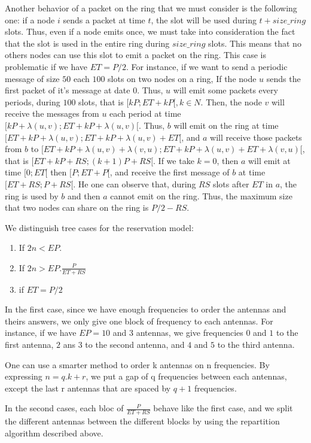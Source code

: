 \documentclass[a4paper,10pt]{article}
\begin{document}
Another behavior of a packet on the ring that we must consider is the following one:
 if a node $i$ sends a packet at time $t$, the slot will be used during $t+ size\_ring$ slots. Thus, even if a node emits once, we must take into consideration the fact that the slot is used in the entire ring during $size\_ring$ slots. This means that no others nodes can use this slot to emit a packet on the ring.
This case is problematic if we have $ET =P/2$. For instance, if we want to send a periodic message of size $50$ each $100$ slots on two nodes on a ring, If the node $u$ sends the first packet of it's message at date $0$. Thus, $u$ will emit some packets every periods, during $100$ slots, that is $[kP;ET+kP[, k \in N$. Then, the node $v$ will receive the messages from $u$ each period at time $[kP + \lambda(u,v);ET+kP+\lambda(u,v)[$. Thus, $b$ will emit on the ring at time $[ET + kP + \lambda(u,v);ET+kP+\lambda(u,v) + ET[$, and $a$ will receive those packets from $b$ to $[ET + kP + \lambda(u,v) + \lambda(v,u);ET+kP+\lambda(u,v) + ET + \lambda(v,u)[$, that is $[ET + kP + RS; (k+1)P+RS[$. If we take $k=0$, then $a$ will emit at time $[0;ET[$ then $[P;ET+P[$, and receive the first message of $b$ at time $[ET + RS;  P+RS[$. He one can observe that, during $RS$ slots after $ET$ in $a$, the ring is used by $b$ and then $a$ cannot emit on the ring. Thus, the maximum size that two nodes can share on the ring is $P/2 -RS$.

We distinguish tree cases for the reservation model:
\begin{enumerate}
\item If $2n < EP $.
\item If $2n >EP . \frac{P}{ET+RS}$
\item if $ET = P/2$
\end{enumerate}
	
In the first case, since we have enough frequencies to order the antennas and theirs answers, we only give one block of frequency to each antennas. For instance, if we have $EP = 10$ and $3$ antennas, we give frequencies $0$ and $1$ to the first antenna, $2$ ans $3$ to the second antenna, and $4$ and $5$ to the third antenna.

One can use a smarter method to order k antennas on n frequencies. By expressing $n = q.k + r$, we put a gap of q frequencies between each antennas, except the last r antennas that are spaced by $q+1$ frequencies.

In the second cases, each bloc of $\frac{P}{ET+RS}$ behave like the first case, and we split the different antennas between the different blocks by using the repartition algorithm described above.
\end{document}
